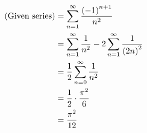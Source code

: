 \item

\begin{align*}
	(\text{Given series})
	 & = \sum_{n = 1}^\infty \frac{{(-1)}^{n + 1}}{n^2}                               \\
	 & = \sum_{n = 1}^\infty \frac{1}{n^2} - 2 \sum_{n = 1}^\infty \frac{1}{{(2n)}^2} \\
	 & = \frac{1}{2} \sum_{n = 0}^\infty \frac{1}{n^2}                                      \\
	 & = \frac{1}{2} \cdot \frac{\pi^2}{6}                                                  \\
	 & = \frac{\pi^2}{12}
\end{align*}
